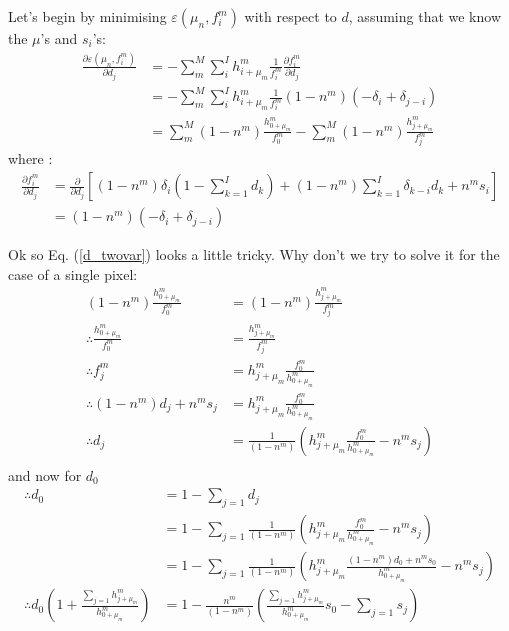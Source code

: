 \documentclass[11pt]{article}
\begin{document}
Let's begin by minimising $\varepsilon(\mu_n, f^m_i)$ with respect to $d$, assuming that we know the $\mu$'s and $s_i$'s:
\begin{align}
   \frac{\partial \varepsilon(\mu_n, f^m_i)}{\partial d_j} &= -\sum_m^M \sum_i^I h^m_{i+\mu_m} \frac{1}{f^m_i} \frac{\partial f^m_i}{\partial d_j} \\
   &= -\sum_m^M \sum_i^I h^m_{i+\mu_m} \frac{1}{f^m_i}(1-n^m)(-\delta_{i} + \delta_{j-i}) \\
   &= \sum_m^M (1-n^m) \frac{ h^m_{0+\mu_m}}{f^m_0}-\sum_m^M (1-n^m) \frac{ h^m_{j+\mu_m}}{f^m_j} 
   \label{d_twovar}
\end{align}
where :
\begin{align}
   \frac{\partial f^m_i}{\partial d_j} &= \frac{\partial }{\partial d_j} \left[ (1-n^m)\delta_{i} (1 - \sum_{k=1}^I d_k) + (1-n^m)\sum_{k=1}^I \delta_{k-i} d_k + n^m s_i\right] \\
   &= (1-n^m)(-\delta_{i} + \delta_{j-i})
\end{align}

Ok so Eq. (\ref{d_twovar}) looks a little tricky. Why don't we try to solve it for the case of a single pixel:
\begin{align}
   (1-n^m) \frac{ h^m_{0+\mu_m}}{f^m_0} &= (1-n^m) \frac{ h^m_{j+\mu_m}}{f^m_j}  \\
   \therefore \frac{ h^m_{0+\mu_m}}{f^m_0} &= \frac{ h^m_{j+\mu_m}}{f^m_j}  \\
   \therefore f^m_j &= h^m_{j+\mu_m} \frac{f^m_0}{ h^m_{0+\mu_m}} \\
   \therefore (1-n^m)d_j + n^m s_j &= h^m_{j+\mu_m} \frac{f^m_0}{ h^m_{0+\mu_m}} \\
   \therefore d_j &= \frac{1}{(1-n^m)}\left(h^m_{j+\mu_m} \frac{f^m_0}{ h^m_{0+\mu_m}} - n^m s_j\right) \\
\end{align}
and now for $d_0$
\begin{align}
   \therefore d_0 &= 1 - \sum_{j=1} d_j \\
   &=1 - \sum_{j=1} \frac{1}{(1-n^m)}\left(h^m_{j+\mu_m} \frac{f^m_0}{ h^m_{0+\mu_m}} - n^m s_j\right) \\
   &=1 - \sum_{j=1} \frac{1}{(1-n^m)}\left(h^m_{j+\mu_m} \frac{(1-n^m)d_0 + n^m s_0}{ h^m_{0+\mu_m}} - n^m s_j\right) \\
\therefore d_0 \left(1 + \frac{\sum_{j=1} h^m_{j+\mu_m}}{h^m_{0+\mu_m}}\right)  &=1 - \frac{n^m}{(1-n^m)}\left(\frac{\sum_{j=1} h^m_{j+\mu_m} }{ h^m_{0+\mu_m}} s_0 - \sum_{j=1} s_j\right) \\
\end{align}
\end{document}

